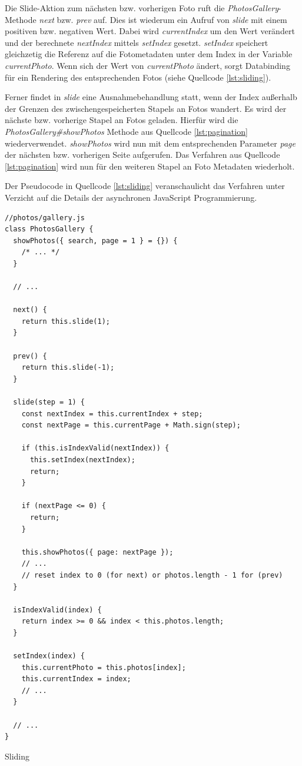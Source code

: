 Die Slide-Aktion zum nächsten bzw. vorherigen Foto ruft die \emph{PhotosGallery}-Methode \emph{next} bzw. \emph{prev} auf. Dies ist wiederum ein Aufruf von \emph{slide} mit einem positiven bzw. negativen Wert. Dabei wird \emph{currentIndex} um den Wert verändert und der berechnete \emph{nextIndex} mittels \emph{setIndex} gesetzt. \emph{setIndex} speichert gleichzetig die Referenz auf die Fotometadaten unter dem Index in der Variable \emph{currentPhoto}. Wenn sich der Wert von \emph{currentPhoto} ändert, sorgt Databinding für ein Rendering des entsprechenden Fotos (siehe Quellcode \ref{lst:sliding}).

 Ferner findet in \emph{slide} eine Ausnahmebehandlung statt, wenn der Index außerhalb der Grenzen des zwischengespeicherten Stapels an Fotos wandert. Es wird der nächste bzw. vorherige Stapel an Fotos geladen. Hierfür wird die \emph{PhotosGallery\#showPhotos} Methode aus Quellcode \ref{lst:pagination} wiederverwendet. \emph{showPhotos} wird nun mit dem entsprechenden Parameter \emph{page} der nächsten bzw. vorherigen Seite aufgerufen. Das Verfahren aus Quellcode \ref{lst:pagination} wird nun für den weiteren Stapel an Foto Metadaten wiederholt.

Der Pseudocode in Quellcode \ref{lst:sliding} veranschaulicht das Verfahren unter Verzicht auf die Details der asynchronen JavaScript Programmierung.

\begin{listing}[H]
\begin{verbatim}
//photos/gallery.js
class PhotosGallery {
  showPhotos({ search, page = 1 } = {}) {
    /* ... */
  }

  // ...

  next() {
    return this.slide(1);
  }

  prev() {
    return this.slide(-1);
  }

  slide(step = 1) {
    const nextIndex = this.currentIndex + step;
    const nextPage = this.currentPage + Math.sign(step);

    if (this.isIndexValid(nextIndex)) {
      this.setIndex(nextIndex);
      return;
    }

    if (nextPage <= 0) {
      return;
    }

    this.showPhotos({ page: nextPage });
    // ...
    // reset index to 0 (for next) or photos.length - 1 for (prev)
  }

  isIndexValid(index) {
    return index >= 0 && index < this.photos.length;
  }

  setIndex(index) {
    this.currentPhoto = this.photos[index];
    this.currentIndex = index;
    // ...
  }

  // ...
}

\end{verbatim}
\caption{Sliding}
\label{lst:sliding}
\end{listing}
